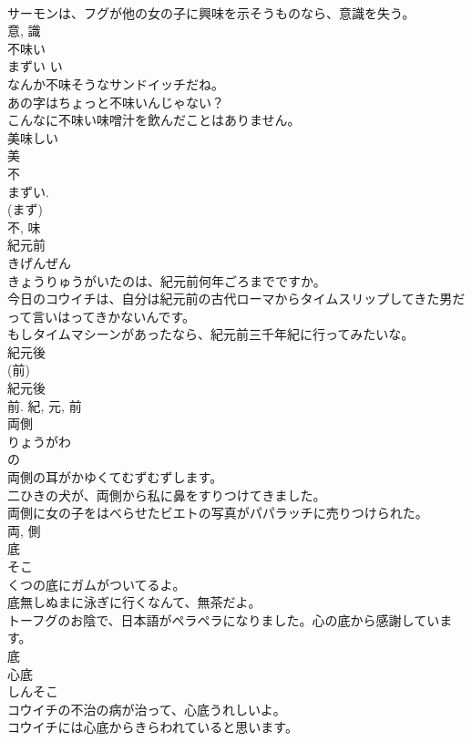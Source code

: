 \documentclass[8pt]{extreport}
\begin{document}
\begin{CJK}{UTF8}{min}
\\	サーモンは、フグが他の女の子に興味を示そうものなら、意識を失う。	
\\	意, 識	
\\	不味い	
\\	まずい	い 
\\	なんか不味そうなサンドイッチだね。	
\\	あの字はちょっと不味いんじゃない？	
\\	こんなに不味い味噌汁を飲んだことはありません。	
\\	美味しい 
\\	美 
\\	不 
\\	まずい. 
\\	(まず) 
\\	不, 味	
\\	紀元前	
\\	きげんぜん	
\\	きょうりゅうがいたのは、紀元前何年ごろまでですか。	
\\	今日のコウイチは、自分は紀元前の古代ローマからタイムスリップしてきた男だって言いはってきかないんです。	
\\	もしタイムマシーンがあったなら、紀元前三千年紀に行ってみたいな。	
\\	紀元後 
\\	(前) 
\\	紀元後 
\\	前.	紀, 元, 前	
\\	両側	
\\	りょうがわ	
\\	の 
\\	両側の耳がかゆくてむずむずします。	
\\	二ひきの犬が、両側から私に鼻をすりつけてきました。	
\\	両側に女の子をはべらせたビエトの写真がパパラッチに売りつけられた。	
\\	両, 側	
\\	底	
\\	そこ	
\\	くつの底にガムがついてるよ。	
\\	底無しぬまに泳ぎに行くなんて、無茶だよ。	
\\	トーフグのお陰で、日本語がペラペラになりました。心の底から感謝しています。	
\\	底	
\\	心底	
\\	しんそこ	
\\	コウイチの不治の病が治って、心底うれしいよ。	
\\	コウイチには心底からきらわれていると思います。	

\end{CJK}
\end{document}
